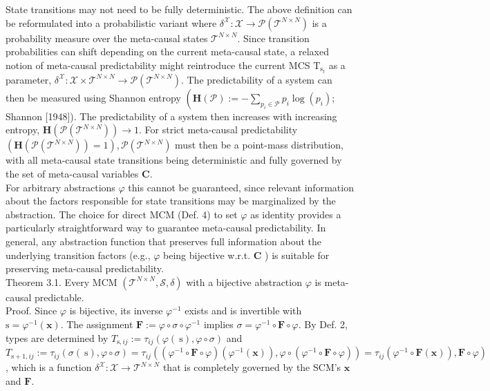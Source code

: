 \documentclass[10pt]{article}
\begin{document}
State transitions may not need to be fully deterministic. The above definition can be reformulated into a probabilistic variant where $\delta^{\mathcal{X}}: \mathcal{X} \rightarrow \mathcal{P}\left(\mathcal{T}^{N \times N}\right)$ is a probability measure over the meta-causal states $\mathcal{T}^{N \times N}$. Since transition probabilities can shift depending on the current meta-causal state, a relaxed notion of meta-causal predictability might reintroduce the current MCS $\mathrm{T}_{\mathrm{s}_{t}}$ as a parameter, $\delta^{\mathcal{X}}: \mathcal{X} \times \mathcal{T}^{N \times N} \rightarrow \mathcal{P}\left(\mathcal{T}^{N \times N}\right)$. The predictability of a system can then be measured using Shannon entropy $\left(\mathbf{H}(\mathcal{P}):=-\sum_{p_{i} \in \mathcal{P}} p_{i} \log \left(p_{i}\right)\right.$; Shannon [1948]). The predictability of a system then increases with increasing entropy, $\mathbf{H}\left(\mathcal{P}\left(\mathcal{T}^{N \times N}\right)\right) \rightarrow 1$. For strict meta-causal predictability $\left(\mathbf{H}\left(\mathcal{P}\left(\mathcal{T}^{N \times N}\right)\right)=1\right), \mathcal{P}\left(\mathcal{T}^{N \times N}\right)$ must then be a point-mass distribution, with all meta-causal state transitions being deterministic and fully governed by the set of meta-causal variables $\mathbf{C}$.\\
For arbitrary abstractions $\varphi$ this cannot be guaranteed, since relevant information about the factors responsible for state transitions may be marginalized by the abstraction. The choice for direct MCM (Def. 4) to set $\varphi$ as identity provides a particularly straightforward way to guarantee meta-causal predictability. In general, any abstraction function that preserves full information about the underlying transition factors (e.g., $\varphi$ being bijective w.r.t. $\mathbf{C}$ ) is suitable for preserving meta-causal predictability.\\
Theorem 3.1. Every MCM $\left(\mathcal{T}^{N \times N}, \mathcal{S}, \delta\right)$ with a bijective abstraction $\varphi$ is meta-causal predictable.\\
Proof. Since $\varphi$ is bijective, its inverse $\varphi^{-1}$ exists and is invertible with $\mathrm{s}=\varphi^{-1}(\mathbf{x})$. The assignment $\mathbf{F}:=\varphi \circ \sigma \circ \varphi^{-1}$ implies $\sigma=\varphi^{-1} \circ \mathbf{F} \circ \varphi$. By Def. 2, types are determined by $T_{\mathrm{s}, i j}:= \tau_{i j}(\varphi(\mathrm{~s}), \varphi \circ \sigma)$ and $T_{\mathrm{s}+1, i j}:=\tau_{i j}(\sigma(\mathrm{~s}), \varphi \circ \sigma)=\tau_{i j}\left(\left(\varphi^{-1} \circ \mathbf{F} \circ \varphi\right)\left(\varphi^{-1}(\mathbf{x})\right), \varphi \circ\left(\varphi^{-1} \circ \mathbf{F} \circ \varphi\right)\right)= \left.\tau_{i j}\left(\varphi^{-1} \circ \mathbf{F}(\mathbf{x})\right), \mathbf{F} \circ \varphi\right)$, which is a function $\delta^{\mathcal{X}}: \mathcal{X} \rightarrow \mathcal{T}^{N \times N}$ that is completely governed by the SCM's $\mathbf{x}$ and $\mathbf{F}$.
\end{document}
